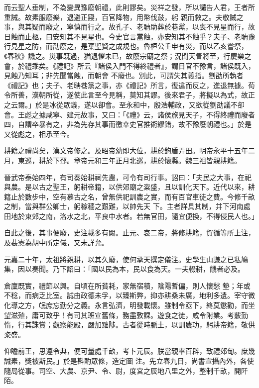 \begin{pinyinscope}
 而云聖人垂制，不為變異豫廢朝禮，此則謬矣。災祥之發，所以譴告人君，王者所重誡。故素服廢樂，退避正寢，百官降物，用幣伐鼓，躬
 親而救之。夫敬誡之事，與其疑而廢之，寧慎而行之。故孔子、老聃助葬於巷黨，以喪不見星而行，故日蝕而止柩，曰安知其不見星也。今史官言當蝕，亦安知其不蝕乎？夫子、老聃豫行見星之防，而劭廢之，是棄聖賢之成規也。魯桓公壬申有災，而以乙亥嘗祭，《春秋》譏之。災事既過，猶退懼未已，故廢宗廟之祭；況聞天眚將至，行慶樂之會，於禮乖矣。《禮記》所云『諸侯入門不得終禮者』，謂日官不豫言，諸侯既入，見蝕乃知耳；非先聞當蝕，而朝會
 不廢也。別此，可謂失其義指。劉劭所執者《禮記》也；夫子、老聃巷黨之事，亦《禮記》所言，復違而反之，進退無據。荀令所善，漢朝所從，遂使此言至今見稱，莫知其謬。後來君子，將擬以為式，故正之云爾。」於是冰從眾議，遂以卻會。至永和中，殷浩輔政，又欲從劉劭議不卻會。王彪之據咸寧、建元故事，又曰：「《禮》云，諸侯旅見天子，不得終禮而廢者四，自謂卒暴有之，非為先存其事而徼幸史官推術繆錯，故不豫廢朝禮也。」於是又從彪之，相承至今。



 耕籍之禮尚矣，漢文帝修之。及昭帝幼即大位，耕於鉤盾弄田。明帝永平十五年二月，東巡，耕於下邳。章帝元和三年正月北巡，耕於懷縣。魏三祖皆親耕籍。



 晉武帝泰始四年，有司奏始耕祠先農，可令有司行事。詔曰：「夫民之大事，在祀與農。是以古之聖王，躬耕帝籍，以供郊廟之粢盛，且以訓化天下。近代以來，耕籍止於數步中，空有慕古之名，曾無供祀訓農之實，而有百官車徒之費。今修千畝之制，當與群公卿士，躬稼穡之艱難，以帥先天
 下。主者詳具其制，并下河南處田地於東郊之南，洛水之北，平良中水者。若無官田，隨宜便換，不得侵民人也。」



 自此之後，其事便廢，史注載多有闕。止元、哀二帝，將修耕籍，賀循等所上注，及裴憲為胡中所定儀，又未詳允。



 元嘉二十年，太祖將親耕，以其久廢，使何承天撰定儀注。史學生山謙之已私鳩集，因以奏聞。乃下詔曰：「國以民為本，民以食為天。一夫輟耕，饑者必及。



 倉廩既實，禮節以興。自頃在所貧耗，家無宿積，陰陽暫偏，則人懷愁
 墊；年或不稔，而病乏比室。誠由政德未孚，以臻斯弊，抑亦耕桑未廣，地利多遺。宰守微化導之方，氓庶忘勤分之義。永言弘濟，明發載懷。雖制令亟下，終莫懲勸，而坐望滋殖，庸可致乎！有司其班宣舊條，務盡敦課。遊食之徒，咸令附業。考覈勤惰，行其誅賞；觀察能殿，嚴加黜陟。古者從時脈土，以訓農功，躬耕帝籍，敬供粢盛。



 仰瞻前王，思遵令典，便可量處千畝，考卜元辰。朕當親率百辟，致禮郊甸。庶幾誠素，獎被斯民。」於是斟酌眾條，造定圖
 注。先立春九日，尚書宣攝內外，各使隨局從事。司空、大農、京尹、令、尉，度宮之辰地八里之外，整制千畝，開阡陌。




\end{pinyinscope}
